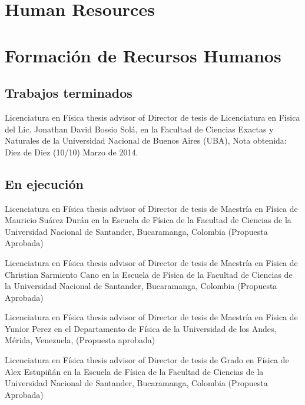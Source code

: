 \ifeng
\section*{Human Resources}
\else
\section*{Formación de Recursos Humanos}
\fi


\subsection*{Trabajos terminados}

\ifeng
Licenciatura en Física thesis advisor of
\else
Director de tesis de Licenciatura en Física del
\fi
Lic. Jonathan David Bossio Solá, en la Facultad de Ciencias Exactas y Naturales de la Universidad Nacional de Buenos Aires (UBA), Nota obtenida: Diez de Diez (10/10) Marzo de 2014.

\subsection*{En ejecución}

\ifeng
Licenciatura en Física thesis advisor of
\else
Director de tesis de Maestría en Física de
\fi
Mauricio Suárez Durán en la Escuela de Física de la Facultad de Ciencias de la Universidad Nacional de Santander, Bucaramanga, Colombia (Propuesta Aprobada)

\ifeng
Licenciatura en Física thesis advisor of
\else
Director de tesis de Maestría en Física de
\fi
Christian Sarmiento Cano en la Escuela de Física de la Facultad de Ciencias de la Universidad Nacional de Santander, Bucaramanga, Colombia (Propuesta Aprobada)

\ifeng
Licenciatura en Física thesis advisor of
\else
Director de tesis de Maestría en Física de
\fi
Yunior Perez en el Departamento de Física de la Universidad de los Andes, Mérida, Venezuela, (Propuesta aprobada)

\ifeng
Licenciatura en Física thesis advisor of
\else
Director de tesis de Grado en Física de
\fi
Alex Estupiñán en la Escuela de Física de la Facultad de Ciencias de la Universidad Nacional de Santander, Bucaramanga, Colombia (Propuesta Aprobada)


